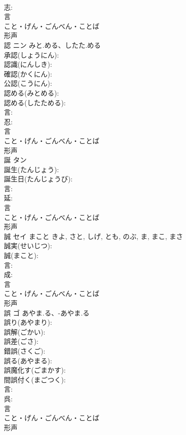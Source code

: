 \documentclass[8pt]{extreport}
\begin{document}
\begin{CJK}{UTF8}{min}
\\	志: 
\\	言	
\\	こと・げん・ごんべん・ことば	
\\	形声 
\\	認	ニン	みと.める、したた.める		
\\	承認(しょうにん): 
\\	認識(にんしき): 
\\	確認(かくにん): 
\\	公認(こうにん): 
\\	認める(みとめる): 
\\	認める(したためる): 
\\	言: 
\\	忍: 
\\	言	
\\	こと・げん・ごんべん・ことば	
\\	形声 
\\	誕	タン			
\\	誕生(たんじょう): 
\\	誕生日(たんじょうび): 
\\	言: 
\\	延: 
\\	言	
\\	こと・げん・ごんべん・ことば	
\\	形声 
\\	誠	セイ	まこと	きよ, さと, しげ, とも, のぶ, ま, まこ, まさ	
\\	誠実(せいじつ): 
\\	誠(まこと): 
\\	言: 
\\	成: 
\\	言	
\\	こと・げん・ごんべん・ことば	
\\	形声 
\\	誤	ゴ	あやま.る、-あやま.る		
\\	誤り(あやまり): 
\\	誤解(ごかい): 
\\	誤差(ごさ): 
\\	錯誤(さくご): 
\\	誤る(あやまる): 
\\	誤魔化す(ごまかす): 
\\	間誤付く(まごつく): 
\\	言: 
\\	呉: 
\\	言	
\\	こと・げん・ごんべん・ことば	
\\	形声 

\end{CJK}
\end{document}
